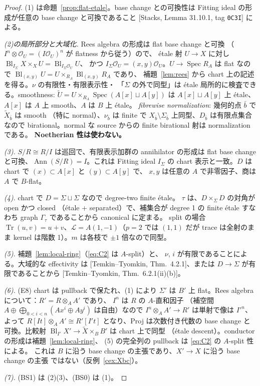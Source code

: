 \documentclass[11pt,a4paper]{article}
\numberwithin{equation}{section}
\theoremstyle{definition}
\DeclareMathOperator{\Tr}{Tr}
\DeclareMathOperator{\Bl}{Bl}
\DeclareMathOperator{\Ann}{Ann}
\newcommand{\OO}{\mathcal O}
\newcommand{\tX}{\widetilde X}
\newcommand{\LL}{\mathcal L}
\begin{document}
\begin{proof}
(1) は命題~\ref{prop:flat-etale}。base change との可換性は
Fitting ideal の形成が任意の base change と可換であること
[Stacks, Lemma 31.10.1, tag \texttt{0C3I}] による。

\medskip
\emph{(2)の局所部分と大域化.}
Rees algebra の形成は flat base change と可換
（$I^n\otimes\OO_U=(I\OO_U)^n$ が flatness から従う）ので、
étale 射 $U\to X$ に対し $\Bl_{I_\Sigma}X\times_XU=\Bl_{I_\Sigma\OO_U}U$、
かつ $I_\Sigma\OO_U=(x,y)\OO_U$。$U\to\operatorname{Spec}R_A$ は flat なので
$\Bl_{(x,y)}U=U\times_{R_A}\Bl_{(x,y)}R_A$ であり、
補題~\ref{lem:rees} から chart 上の記述を得る。$\nu$ の有限性・有限表示性・
「$\Sigma$ の外で同型」は étale 局所的に検査できる。smoothness:
$\tilde U=U\times_{R_A}\operatorname{Spec}(A[x]\sqcup A[y])$ は
$A[x]\sqcup A[y]$ 上 étale、$A[x]$ は $A$ 上 smooth、$A$ は $B$ 上 étale。
\emph{fibrewise normalization}: 幾何的点 $\bar b$ で $\tX_{\bar b}$ は smooth
（特に normal）、$\nu_{\bar b}$ は finite で $X_{\bar b}\setminus
\Sigma_{\bar b}$ 上同型、$D_{\bar b}$ は有限点集合なので birational。normal な
source からの finite birational 射は normalization である。
\textbf{Noetherian 性は使わない。}

\emph{(3).} $S/R\cong R/I$ は巡回で、有限表示加群の annihilator の形成は
flat base change と可換、$\Ann(S/R)=I$。これは Fitting ideal $I_\Sigma$ の
chart 表示と一致。$D$ は chart で $(x)\subset A[x]$ と $(y)\subset A[y]$ で、
$x,y$ は任意の $A$ で非零因子、商は $A$ で $B$-flat。

\emph{(4).} chart で $D=\Sigma\sqcup\Sigma$ なので degree-two finite étale。
$\tau$ は、$D\times_\Sigma D$ の対角が open かつ closed
（étale + separated）で、補集合が degree 1 の finite étale
すなわち graph $\Gamma_\tau$ であることから canonical に定まる。
split の場合 $\Tr(u,v)=u+v$、$\LL=A(1,-1)$（$p=2$ では $(1,1)$ だが
trace は全射のまま kernel は階数 1）。$m$ は各枝で $\pm1$ 倍なので同型。

\emph{(5).} 補題~\ref{lem:local-ring}（\eqref{eq:C2} は $A$-split）と、
$\nu$, $i$ が有限であることによる。大域的な effectivity は
[Temkin--Tyomkin, Thm.~4.2.1]、または $D\to\Sigma$ が有限であることから
[Temkin--Tyomkin, Thm.~6.2.1(ii)(b)]。

\emph{(6).} (E8) chart は pullback で保たれ、(1) により $\Sigma'$ は
$B'$ 上 flat。Rees algebra について：$R'=R\otimes_AA'$ であり、
$I^n$ は $R$ の $A$-直和因子
（補空間 $A\oplus\bigoplus_{0<i<n}(Ax^i\oplus Ay^i)$ は自由）なので
$I^n\otimes_AA'\to R'$ は単射で像は $I'^n$、よって
$R[It]\otimes_AA'\cong R'[I't]$ となり、Proj は次数付き代数の base change と
可換。比較射 $\Bl_{I'}X'\to\tX\times_BB'$ は chart 上で同型
（étale descent）。conductor の形成は補題~\ref{lem:local-ring}、
(5) の完全列の pullback は \eqref{eq:C2} の $A$-split 性による。
これは $B$ に沿う base change の主張であり、$X'\to X$ に沿う base change の主張
ではない（反例~\ref{cex:Xbc}）。

\emph{(7).} (BS1) は (2)(3)、(BS0) は (1)。
\end{proof}
\end{document}
